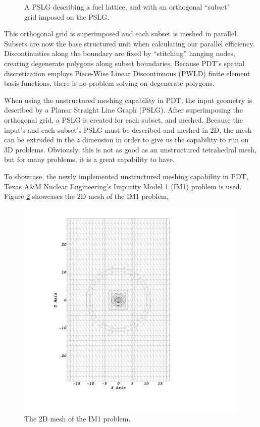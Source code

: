 \documentclass{anstrans}
\begin{document}
\begin{figure}[H]
\caption{A PSLG describing a fuel lattice, and with an orthogonal ``subset" grid imposed on the PSLG.}
\label{grid}
\end{figure}

This orthogonal grid is superimposed and each subset is meshed in parallel.  Subsets are now the base structured unit when calculating our parallel efficiency. Discontinuities along the boundary are fixed by ``stitching'' hanging nodes, creating degenerate polygons along subset boundaries. Because PDT's spatial discretization employs Piece-Wise Linear Discontinuous (PWLD) finite element basis functions, there is no problem solving on degenerate polygons. 

When using the unstructured meshing capability in PDT, the input geometry is described by a Planar Straight Line Graph (PSLG). After superimposing the orthogonal grid, a PSLG is created for each subset, and meshed. Because the input's and each subset's PSLG must be described and meshed in 2D, the mesh can be extruded in the $z$ dimension in order to give us the capability to run on 3D problems. Obviously, this is not as good as an unstructured tetrahedral mesh, but for many problems, it is a great capability to have. 

To showcase, the newly implemented unstructured meshing capability in PDT, Texas A\&M Nuclear Engineering's Impurity Model 1 (IM1) problem is used. Figure \ref{IM12D} showcases the 2D mesh of the IM1 problem,

\begin{figure}[H]
\centering
\includegraphics[scale = 0.13, trim=28cm  4cm 0cm 4cm,clip]{figures/im12d.png}
\caption{The 2D mesh of the IM1 problem.}
\label{IM12D}
\end{figure}
\end{document}
